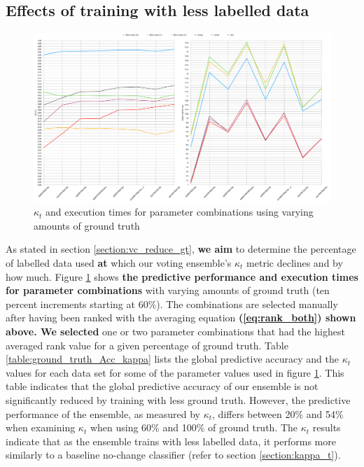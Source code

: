 \subsection{Effects of training with less labelled data}
\begin{figure}
  \includegraphics[width=\linewidth]{./images/chapter5/ground_truth_both}
\caption{\label{fig:ground_truth_drop}$\kappa_t$ and execution times for parameter combinations using varying amounts of ground truth}
\end{figure}

As stated in section \ref{section:vc_reduce_gt}, \textbf{we aim} to determine the percentage of labelled data used \textbf{at} which our voting ensemble's $\kappa_t$ metric declines and by how much. Figure \ref{fig:ground_truth_drop} shows \textbf{the predictive performance and execution times for parameter combinations} with varying amounts of ground truth (ten percent increments starting at 60\%). The combinations are selected manually after having been ranked with the averaging equation \textbf{(\ref{eq:rank_both}) shown above. We selected} one or two parameter combinations that had the highest averaged rank value for a given percentage of ground truth. Table \ref{table:ground_truth_Acc_kappa} lists the global predictive accuracy and the $\kappa_t$ values for each data set for some of the parameter values used in figure \ref{fig:ground_truth_drop}. This table indicates that the global predictive accuracy of our ensemble is not significantly reduced by training with less ground truth. However, the predictive performance of the ensemble, as measured by $\kappa_t$, differs between 20\% and 54\% when examining $\kappa_t$ when using 60\% and 100\% of ground truth. The $\kappa_t$ results indicate that as the ensemble trains with less labelled data, it performs more similarly to a baseline no-change classifier (refer to section \ref{section:kappa_t}).


